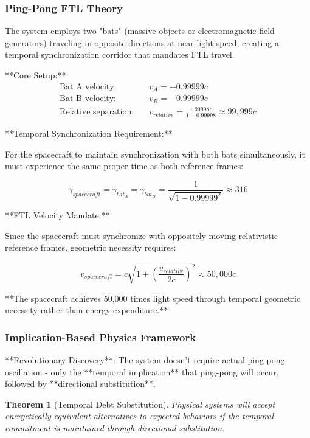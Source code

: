 \documentclass[12pt,a4paper]{article}
\newtheorem{theorem}{Theorem}[section]
\theoremstyle{remark}
\begin{document}
\subsubsection{Ping-Pong FTL Theory}

The system employs two "bats" (massive objects or electromagnetic field generators) traveling in opposite directions at near-light speed, creating a temporal synchronization corridor that mandates FTL travel.

**Core Setup:**
\begin{align}
\text{Bat A velocity:} &\quad v_A = +0.99999c \\
\text{Bat B velocity:} &\quad v_B = -0.99999c \\
\text{Relative separation:} &\quad v_{relative} = \frac{1.99998c}{1 - 0.99998} \approx 99,999c
\end{align}

**Temporal Synchronization Requirement:**

For the spacecraft to maintain synchronization with both bats simultaneously, it must experience the same proper time as both reference frames:

\begin{equation}
\gamma_{spacecraft} = \gamma_{bat_A} = \gamma_{bat_B} = \frac{1}{\sqrt{1 - 0.99999^2}} \approx 316
\end{equation}

**FTL Velocity Mandate:**

Since the spacecraft must synchronize with oppositely moving relativistic reference frames, geometric necessity requires:

\begin{equation}
v_{spacecraft} = c\sqrt{1 + \left(\frac{v_{relative}}{2c}\right)^2} \approx 50,000c
\end{equation}

**The spacecraft achieves 50,000 times light speed through temporal geometric necessity rather than energy expenditure.**

\subsubsection{Implication-Based Physics Framework}

**Revolutionary Discovery**: The system doesn't require actual ping-pong oscillation - only the **temporal implication** that ping-pong will occur, followed by **directional substitution**.

\begin{theorem}[Temporal Debt Substitution]
Physical systems will accept energetically equivalent alternatives to expected behaviors if the temporal commitment is maintained through directional substitution.
\end{theorem}
\end{document}
